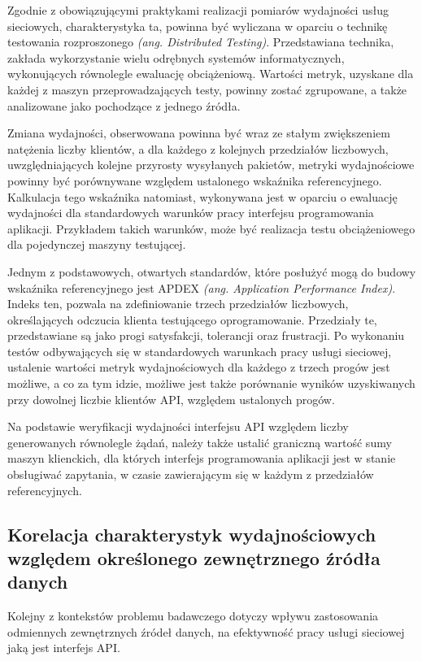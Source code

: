 Zgodnie z obowiązującymi praktykami realizacji pomiarów wydajności usług sieciowych, charakterystyka ta, powinna być wyliczana w oparciu o technikę testowania rozproszonego \textit{(ang. Distributed Testing)}. Przedstawiana technika, zakłada wykorzystanie wielu odrębnych systemów informatycznych, wykonujących równolegle ewaluację obciążeniową. Wartości metryk, uzyskane dla każdej z maszyn przeprowadzających testy, powinny zostać zgrupowane, a także analizowane jako pochodzące z jednego źródła.

Zmiana wydajności, obserwowana powinna być wraz ze stałym zwiększeniem natężenia liczby klientów, a dla każdego z kolejnych przedziałów liczbowych, uwzględniających kolejne przyrosty wysyłanych pakietów, metryki wydajnościowe powinny być porównywane względem ustalonego wskaźnika referencyjnego. Kalkulacja tego wskaźnika natomiast, wykonywana jest w oparciu o ewaluację wydajności dla standardowych warunków pracy interfejsu programowania aplikacji. Przykładem takich warunków, może być realizacja testu obciążeniowego dla pojedynczej maszyny testującej.

Jednym z podstawowych, otwartych standardów, które posłużyć mogą do budowy wskaźnika referencyjnego jest APDEX \textit{(ang. Application Performance Index)}. Indeks ten, pozwala na zdefiniowanie trzech przedziałów liczbowych, określających odczucia klienta testującego oprogramowanie. Przedziały te, przedstawiane są jako progi satysfakcji, tolerancji oraz frustracji. Po wykonaniu testów odbywających się w standardowych warunkach pracy usługi sieciowej, ustalenie wartości metryk wydajnościowych dla każdego z trzech progów jest możliwe, a co za tym idzie, możliwe jest także porównanie wyników uzyskiwanych przy dowolnej liczbie klientów API, względem ustalonych progów.

Na podstawie weryfikacji wydajności interfejsu API względem liczby generowanych równolegle żądań, należy także ustalić graniczną wartość sumy maszyn klienckich, dla których interfejs programowania aplikacji jest w stanie obsługiwać zapytania, w czasie zawierającym się w każdym z przedziałów referencyjnych. 
\subsection*{Korelacja charakterystyk wydajnościowych względem określonego zewnętrznego źródła danych}
Kolejny z kontekstów problemu badawczego dotyczy wpływu zastosowania odmiennych zewnętrznych źródeł danych, na efektywność pracy usługi sieciowej jaką jest interfejs API.

